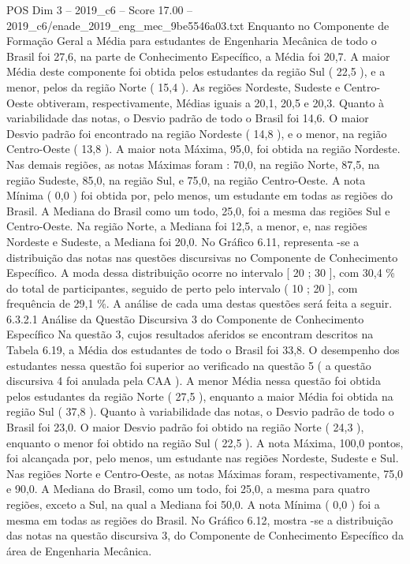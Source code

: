 \begin{textsample}{POS Dim 3 – 2019\_c6 – Score 17.00 – 2019\_c6/enade\_2019\_eng\_mec\_9be5546a03.txt}
Enquanto no Componente de Formação Geral a Média para estudantes de Engenharia Mecânica de todo o Brasil foi 27,6, na parte de Conhecimento Específico, a Média foi 20,7.
A maior Média deste componente foi obtida pelos estudantes da região Sul ( 22,5 ), e a menor, pelos da região Norte ( 15,4 ).
As regiões Nordeste, Sudeste e Centro-Oeste obtiveram, respectivamente, Médias iguais a 20,1, 20,5 e 20,3.
Quanto à variabilidade das notas, o Desvio padrão de todo o Brasil foi 14,6.
O maior Desvio padrão foi encontrado na região Nordeste ( 14,8 ), e o menor, na região Centro-Oeste ( 13,8 ).
A maior nota Máxima, 95,0, foi obtida na região Nordeste.
Nas demais regiões, as notas Máximas foram : 70,0, na região Norte, 87,5, na região Sudeste, 85,0, na região Sul, e 75,0, na região Centro-Oeste.
A nota Mínima ( 0,0 ) foi obtida por, pelo menos, um estudante em todas as regiões do Brasil.
A Mediana do Brasil como um todo, 25,0, foi a mesma das regiões Sul e Centro-Oeste.
Na região Norte, a Mediana foi 12,5, a menor, e, nas regiões Nordeste e Sudeste, a Mediana foi 20,0.
No Gráfico 6.11, representa -se a distribuição das notas nas questões discursivas no Componente de Conhecimento Específico.
A moda dessa distribuição ocorre no intervalo [ 20 ; 30 ], com 30,4 \% do total de participantes, seguido de perto pelo intervalo ( 10 ; 20 ], com frequência de 29,1 \%.
A análise de cada uma destas questões será feita a seguir. 6.3.2.1 Análise da Questão Discursiva 3 do Componente de Conhecimento Específico Na questão 3, cujos resultados aferidos se encontram descritos na Tabela 6.19, a Média dos estudantes de todo o Brasil foi 33,8.
O desempenho dos estudantes nessa questão foi superior ao verificado na questão 5 ( a questão discursiva 4 foi anulada pela CAA ).
A menor Média nessa questão foi obtida pelos estudantes da região Norte ( 27,5 ), enquanto a maior Média foi obtida na região Sul ( 37,8 ).
Quanto à variabilidade das notas, o Desvio padrão de todo o Brasil foi 23,0.
O maior Desvio padrão foi obtido na região Norte ( 24,3 ), enquanto o menor foi obtido na região Sul ( 22,5 ).
A nota Máxima, 100,0 pontos, foi alcançada por, pelo menos, um estudante nas regiões Nordeste, Sudeste e Sul.
Nas regiões Norte e Centro-Oeste, as notas Máximas foram, respectivamente, 75,0 e 90,0.
A Mediana do Brasil, como um todo, foi 25,0, a mesma para quatro regiões, exceto a Sul, na qual a Mediana foi 50,0.
A nota Mínima ( 0,0 ) foi a mesma em todas as regiões do Brasil.
No Gráfico 6.12, mostra -se a distribuição das notas na questão discursiva 3, do Componente de Conhecimento Específico da área de Engenharia Mecânica.

\end{textsample}
